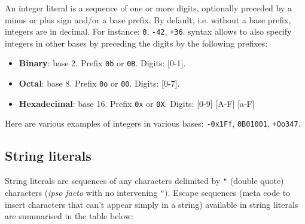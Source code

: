An integer literal is a sequence of one or more digits, optionally
preceded by a minus or plus sign and/or a base prefix. By default,
i.e. without a base prefix, integers are in decimal. For instance:
{\tt 0}, {\tt -42}, {\tt +36}. {\focal} syntax allows to also specify
integers in other bases by preceding the digits by the following
prefixes:
\begin{itemize}
  \item {\bf Binary}: base 2. Prefix {\tt 0b} or {\tt 0B}.
    Digits: [0-1].
  \item {\bf Octal}: base 8. Prefix {\tt 0o} or {\tt 00}.
    Digits: [0-7].
  \item {\bf Hexadecimal}: base 16. Prefix {\tt 0x} or {\tt 0X}.
    Digits: [0-9] [A-F] [a-F]
\end{itemize}
Here are various examples of integers in various bases:
{\tt -0x1Ff}, {\tt 0B01001}, {\tt +Oo347}.

\subsection{String literals}
\label{string literal}
String literals are sequences of any characters delimited by {\tt "}
(double quote) characters ({\em ipso facto} with no intervening
{\tt"}).
Escape sequences (meta code to insert characters that can't appear
simply in a string) available in string literals are summarised in the
table below:

